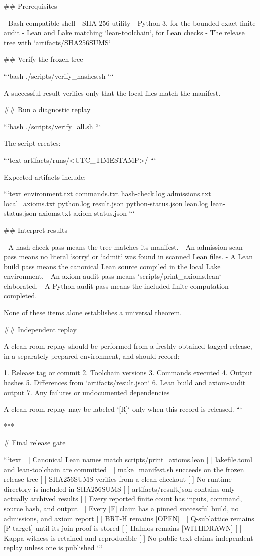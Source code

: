 ## Prerequisites

- Bash-compatible shell
- SHA-256 utility
- Python 3, for the bounded exact finite audit
- Lean and Lake matching `lean-toolchain`, for Lean checks
- The release tree with `artifacts/SHA256SUMS`

## Verify the frozen tree

```bash
./scripts/verify_hashes.sh
```

A successful result verifies only that the local files match the manifest.

## Run a diagnostic replay

```bash
./scripts/verify_all.sh
```

The script creates:

```text
artifacts/runs/<UTC_TIMESTAMP>/
```

Expected artifacts include:

```text
environment.txt
commands.txt
hash-check.log
admissions.txt
local_axioms.txt
python.log
result.json
python-status.json
lean.log
lean-status.json
axioms.txt
axiom-status.json
```

## Interpret results

- A hash-check pass means the tree matches its manifest.
- An admission-scan pass means no literal `sorry` or `admit` was found in
  scanned Lean files.
- A Lean build pass means the canonical Lean source compiled in the local
  Lake environment.
- An axiom-audit pass means `scripts/print_axioms.lean` elaborated.
- A Python-audit pass means the included finite computation completed.

None of these items alone establishes a universal theorem.

## Independent replay

A clean-room replay should be performed from a freshly obtained tagged
release, in a separately prepared environment, and should record:

1. Release tag or commit
2. Toolchain versions
3. Commands executed
4. Output hashes
5. Differences from `artifacts/result.json`
6. Lean build and axiom-audit output
7. Any failures or undocumented dependencies

A clean-room replay may be labeled `[R]` only when this record is released.
```

***

# Final release gate

```text
[ ] Canonical Lean names match scripts/print_axioms.lean
[ ] lakefile.toml and lean-toolchain are committed
[ ] make_manifest.sh succeeds on the frozen release tree
[ ] SHA256SUMS verifies from a clean checkout
[ ] No runtime directory is included in SHA256SUMS
[ ] artifacts/result.json contains only actually archived results
[ ] Every reported finite count has inputs, command, source hash, and output
[ ] Every [F] claim has a pinned successful build, no admissions, and axiom report
[ ] BRT-H remains [OPEN]
[ ] Q-sublattice remains [P-target] until its join proof is stored
[ ] Halmos remains [WITHDRAWN]
[ ] Kappa witness is retained and reproducible
[ ] No public text claims independent replay unless one is published
```

